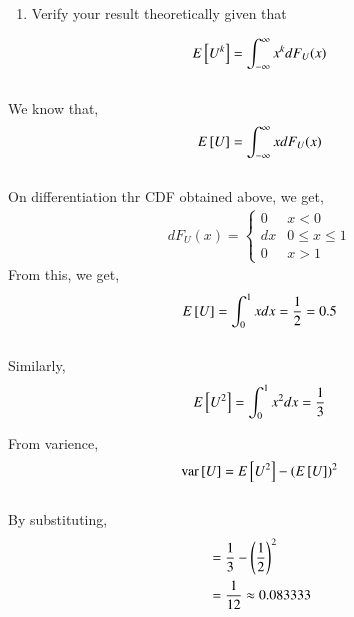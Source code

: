 \documentclass[journal,12pt,twocolumn]{IEEEtran}
\renewcommand\thesection{\arabic{section}}
\begin{document}
\begin{enumerate}[label=\thesection.\arabic*
,ref=\thesection.\theenumi]
Write a C program to  find the mean and variance of $U$. \\
\solution Download the C source code by executing the following commands
\begin{lstlisting}
wget https://github.com/HARI-donk-EY/Rand_nums/blob/main/codes/1/mean_var_cal.c
wget https://github.com/HARI-donk-EY/Rand_nums/blob/main/codes/coeffs.h
\end{lstlisting}

Use the below command in the terminal to run code.
\begin{lstlisting}
gcc mean_var_cal.c -lm -o mean_var_cal.out
./mean_var_cal.out
\end{lstlisting}

From the code we get the output of the Mean as 0.500007, and Variance as 0.083301.\\

\item Verify your result theoretically given that
\end{enumerate}
%
\begin{equation}
E{}\left[U^k\right] = \int_{-\infty}^{\infty}x^kdF_{U}(x)
\end{equation}\\

\solution We know that,
\begin{equation}
E{}\left[U\right] = \int_{-\infty}^{\infty}xdF_{U}(x)
\end{equation}\\
On differentiation thr CDF obtained above, we get,
\begin{align}
		dF_{U}(x) = 
		\begin{cases}
			0 & x < 0 \\
			dx & 0 \le x \le 1 \\
			0 & x > 1
		\end{cases}
\end{align}
From this, we get,
\begin{equation}
	E{}\left[U\right] = \int_{0}^{1}x dx = \frac{1}{2} = 0.5
\end{equation}\\
Similarly, 
\begin{align}
	E{}\left[U^2\right] = \int_{0}^{1}x^2dx = \frac{1}{3}
\end{align}

From varience,
\begin{equation}
\text{var}{}\left[U\right] = E{}\left[U^2\right] - (E{}\left[U\right])^2
\end{equation}\\
By substituting,
\begin{align}
	& = \frac{1}{3} - \left(\frac{1}{2}\right)^2\\
	& = \frac{1}{12} \approx 0.083333
\end{align}\\
\end{document}

